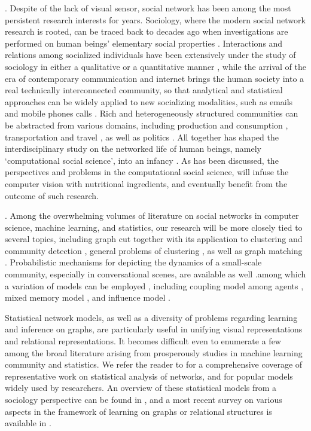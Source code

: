 .  Despite of the lack of visual sensor, social network has been among the most persistent research interests for years. Sociology, where the modern social network research is rooted, can be traced back to decades ago when investigations are performed on human beings' elementary social properties \cite{Darwin,Thomkins,Goffman,Kendon1990,Ekman,Hoyle,Tannen}. Interactions and relations among socialized individuals have been extensively under the study of sociology in either a qualitative or a quantitative manner \cite{Goodwin2000,Goldin,Goodwin2007,Kendon2010}, while the arrival of the era of contemporary communication and internet brings the human society into a real technically interconnected community, so that analytical and statistical approaches can be widely applied to new socializing modalities, such as emails \cite{Eckmann} and mobile phones calls \cite{Onnela,Eagle}. Rich and heterogeneously structured communities can be abstracted from various domains, including production and consumption \cite{Watts}, transportation and travel \cite{Gonzalez},  as well as politics \cite{Iacus}. All together has shaped the interdisciplinary study on the networked life of human beings, namely `computational social science', into an infancy \cite{Lazer2009}. As has been discussed, the perspectives and problems in the computational social science, will infuse the computer vision with nutritional ingredients, and eventually benefit from the outcome of such research.

. Among the overwhelming volumes of literature on social networks in computer science, machine learning, and statistics, our research will be more closely tied to several topics, including graph cut \cite{Boykov:segmentation} together with its application to clustering and community detection \cite{Ng:spectral,Filippone:clustering}, general problems of clustering \cite{Xu:clustering}, as well as graph matching \cite{West:Graph,Caetano:graph}. Probabilistic mechanisms for depicting the dynamics of a small-scale community, especially in conversational scenes, are available as well \cite{Basu:meeting,Dong}.among which a variation of models can be employed , including coupling model among agents \cite{Brand:CHMM}, mixed memory model \cite{Choudhury:MHMM}, and influence model \cite{Pan:influence}.

Statistical network models, as well as a diversity of problems regarding learning and inference on graphs, are particularly useful in unifying visual representations and relational representations. It becomes difficult even to enumerate a few among the broad literature arising from prosperously studies in machine learning community and statistics.  We refer the reader to \cite{Kolacyzk} for a comprehensive coverage of representative work on statistical analysis of networks, and \cite{Goldenberg} for popular models widely used by researchers. An overview of these statistical models from a sociology perspective can be found in \cite{Snijders}, and a most recent survey on various aspects in the framework of learning on graphs or relational structures is available in \cite{Rossi}.


